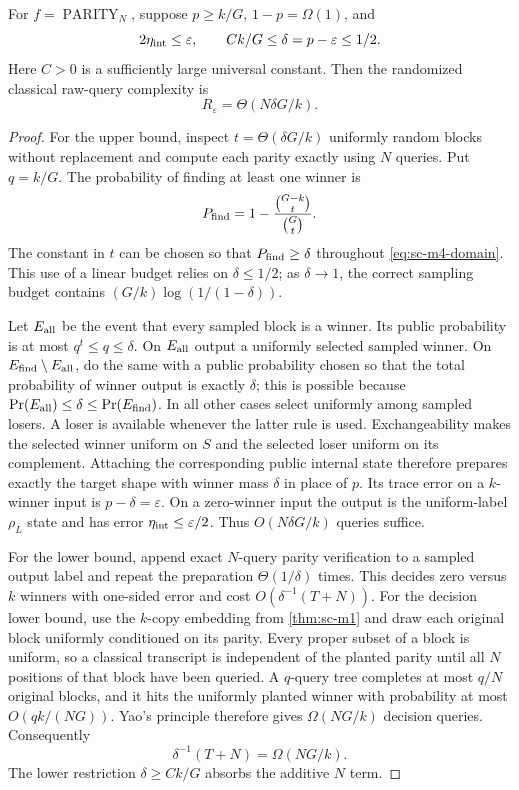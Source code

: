 \begin{theorem}
\label{thm:sc-m4}
For $f=\operatorname{PARITY}_N$, suppose $p\ge k/G$,
$1-p=\Omega(1)$, and
\begin{equation}
 2\eta_{\rm int}\le\varepsilon,
 \qquad Ck/G\le\delta=p-\varepsilon\le1/2.
 \label{eq:sc-m4-domain}
\end{equation}
Here $C>0$ is a sufficiently large universal constant.
Then the randomized classical raw-query complexity is
\[
 R_\varepsilon=\Theta(N\delta G/k).
\]
\end{theorem}

\begin{proof}
For the upper bound, inspect
$t=\Theta(\delta G/k)$ uniformly random blocks without replacement and
compute each parity exactly using $N$ queries.  Put $q=k/G$.  The probability
of finding at least one winner is
\[
 P_{\rm find}=1-\frac{\binom{G-k}{t}}{\binom Gt}.
\]
The constant in $t$ can be chosen so that
$P_{\rm find}\ge\delta$ throughout
\eqref{eq:sc-m4-domain}.  This use of a linear budget relies on
$\delta\le1/2$; as $\delta\to1$, the correct sampling budget contains
$(G/k)\log(1/(1-\delta))$.

Let $E_{\rm all}$ be the event that every sampled block is a winner.  Its
public probability is at most $q^t\le q\le\delta$.  On $E_{\rm all}$ output
a uniformly selected sampled winner.  On
$E_{\rm find}\setminus E_{\rm all}$, do the same with a public probability
chosen so that the total probability of winner output is exactly $\delta$;
this is possible because
$\Pr(E_{\rm all})\le\delta\le\Pr(E_{\rm find})$.  In all other cases select
uniformly among sampled losers.  A loser is available whenever the latter
rule is used.  Exchangeability makes the selected winner uniform on $S$ and
the selected loser uniform on its complement.  Attaching the corresponding
public internal state therefore prepares exactly the target shape with
winner mass $\delta$ in place of $p$.  Its trace error on a $k$-winner input is
$p-\delta=\varepsilon$.  On a zero-winner input the output is the uniform-label
$\rho_L$ state and has error $\eta_{\rm int}\le\varepsilon/2$.  Thus
$O(N\delta G/k)$ queries suffice.

For the lower bound, append exact $N$-query parity verification to a sampled
output label and repeat the preparation $\Theta(1/\delta)$ times.  This
decides zero versus $k$ winners with one-sided error and cost
$O(\delta^{-1}(T+N))$.  For the decision lower bound, use the $k$-copy
embedding from \cref{thm:sc-m1} and draw each original block uniformly
conditioned on its parity.  Every proper subset of a block is uniform, so a
classical transcript is independent of the planted parity until all $N$
positions of that block have been queried.  A $q$-query tree completes at
most $q/N$ original blocks, and it hits the uniformly planted winner with
probability at most $O(qk/(NG))$.  Yao's principle therefore gives
$\Omega(NG/k)$ decision queries.  Consequently
\[
 \delta^{-1}(T+N)=\Omega(NG/k).
\]
The lower restriction $\delta\ge Ck/G$ absorbs the additive $N$ term.
\end{proof}

